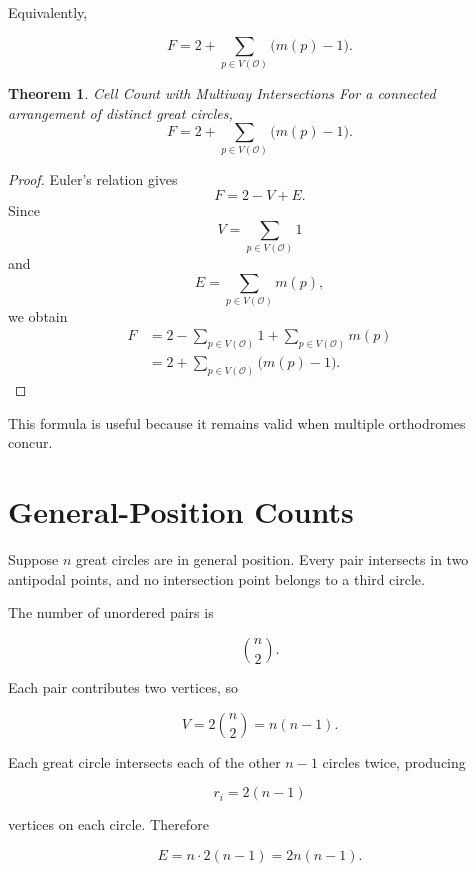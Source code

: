 \documentclass[11pt,fleqn]{book}
\numberwithin{equation}{chapter}
\theoremstyle{plain}
\newtheorem{theorem}{Theorem}[chapter]
\theoremstyle{definition}
\theoremstyle{remark}
\newcommand{\Oset}{\mathcal{O}}
\begin{document}
Equivalently,

\begin{equation}
    F
    =
    2
    +
    \sum_{p\in V(\Oset)}
    \bigl(m(p)-1\bigr).
\end{equation}

\begin{theorem}{Cell Count with Multiway Intersections}
For a connected arrangement of distinct great circles,
\[
F
=
2
+
\sum_{p\in V(\Oset)}
\bigl(m(p)-1\bigr).
\]
\end{theorem}

\begin{proof}
Euler's relation gives
\[
F=2-V+E.
\]
Since
\[
V=\sum_{p\in V(\Oset)}1
\]
and
\[
E=\sum_{p\in V(\Oset)}m(p),
\]
we obtain
\begin{align}
F
&=
2
-
\sum_{p\in V(\Oset)}1
+
\sum_{p\in V(\Oset)}m(p)
\\
&=
2
+
\sum_{p\in V(\Oset)}
\bigl(m(p)-1\bigr).
\end{align}
\end{proof}

This formula is useful because it remains valid when multiple orthodromes concur.

\section{General-Position Counts}

Suppose \(n\) great circles are in general position. Every pair intersects in two antipodal points, and no intersection point belongs to a third circle.

The number of unordered pairs is

\begin{equation}
    \binom{n}{2}.
\end{equation}

Each pair contributes two vertices, so

\begin{equation}
    V
    =
    2\binom{n}{2}
    =
    n(n-1).
\end{equation}

Each great circle intersects each of the other \(n-1\) circles twice, producing

\begin{equation}
    r_i=2(n-1)
\end{equation}

vertices on each circle. Therefore

\begin{equation}
    E
    =
    n\cdot 2(n-1)
    =
    2n(n-1).
\end{equation}
\end{document}
